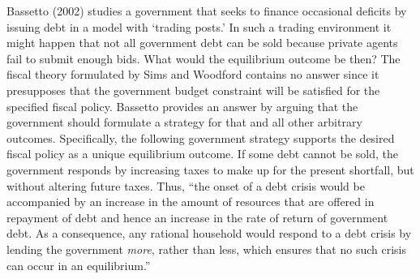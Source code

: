 Bassetto (2002) studies  a government that seeks to
finance occasional deficits by issuing debt in a model with
`trading posts.' In such a trading environment it
might happen that not all government debt can be sold because private
agents fail to submit enough bids. What would  the equilibrium
outcome be then? The fiscal theory formulated by Sims and Woodford contains
no answer since it presupposes that the government budget constraint
will be satisfied for the specified fiscal policy. Bassetto provides
an answer by arguing that the government should formulate a strategy
for that and all other arbitrary outcomes. Specifically, the following
government strategy supports the desired fiscal policy as a unique
equilibrium outcome. If some debt cannot be sold,
the government responds by increasing taxes to make up for the present
shortfall, but without altering future taxes. Thus, ``the onset of a debt crisis
would be accompanied by an increase in the amount of resources that are
offered in repayment of debt and hence an increase in the rate of return
of government debt. As a consequence, any rational household would respond
to a debt crisis by lending the government {\it more}, rather than
less, which ensures that no such crisis can occur in an
equilibrium.''

